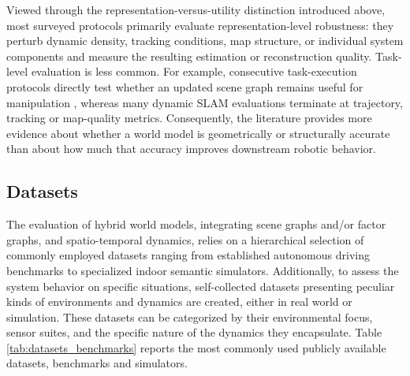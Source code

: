 Viewed through the representation-versus-utility distinction introduced above, most surveyed protocols primarily evaluate representation-level robustness: they perturb dynamic density, tracking conditions, map structure, or individual system components and measure the resulting estimation or reconstruction quality.
Task-level evaluation is less common.
For example, consecutive task-execution protocols directly test whether an updated scene graph remains useful for manipulation \cite{yan_dynamic_2025}, whereas many dynamic SLAM evaluations terminate at trajectory, tracking or map-quality metrics.
Consequently, the literature provides more evidence about whether a world model is geometrically or structurally accurate than about how much that accuracy improves downstream robotic behavior. 


\subsection{Datasets}\label{sec:evaluation_metrics_datasets}
The evaluation of hybrid world models, integrating scene graphs and/or factor graphs, and spatio-temporal dynamics, relies on a hierarchical selection of commonly employed datasets ranging from established autonomous driving benchmarks to specialized indoor semantic simulators.
Additionally, to assess the system behavior on specific situations, self-collected datasets presenting peculiar kinds of environments and dynamics are created, either in real world or simulation. 
These datasets can be categorized by their environmental focus, sensor suites, and the specific nature of the dynamics they encapsulate. 
Table \ref{tab:datasets_benchmarks} reports the most commonly used publicly available datasets, benchmarks and simulators. 

